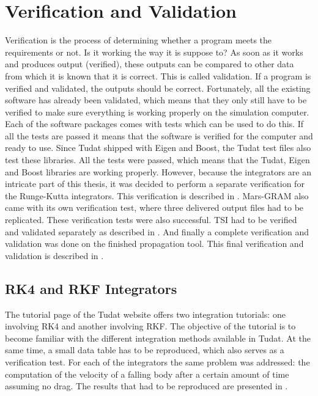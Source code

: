 \chapter{Verification and Validation} 
\label{ch:verificationandvalidation}
Verification is the process of determining whether a program meets the requirements or not. Is it working the way it is suppose to? As soon as it works and produces output (verified), these outputs can be compared to other data from which it is known that it is correct. This is called validation. If a program is verified and validated, the outputs should be correct. Fortunately, all the existing software has already been validated, which means that they only still have to be verified to make sure everything is working properly on the simulation computer. Each of the software packages comes with tests which can be used to do this. If all the tests are passed it means that the software is verified for the computer and ready to use. Since \ac{Tudat} shipped with Eigen and Boost, the \ac{Tudat} test files also test these libraries. All the tests were passed, which means that the \ac{Tudat}, Eigen and Boost libraries are working properly. However, because the integrators are an intricate part of this thesis, it was decided to perform a separate verification for the Runge-Kutta integrators. This verification is described in . Mars-\ac{GRAM} also came with its own verification test, where three delivered output files had to be replicated. These verification tests were also successful. \ac{TSI} had to be verified and validated separately as described in . And finally a complete verification and validation was done on the finished propagation tool. This final verification and validation is described in .


\section{\acs{RK4} and \acs{RKF} Integrators}
\label{sec:rkandrkfver}
The tutorial page of the \ac{Tudat} website \citep{dirkx2016tudat} offers two integration tutorials: one involving \ac{RK4} and another involving \ac{RKF}. The objective of the tutorial is to become familiar with the different integration methods available in \ac{Tudat}. At the same time, a small data table has to be reproduced, which also serves as a verification test. For each of the integrators the same problem was addressed: the computation of the velocity of a falling body after a certain amount of time assuming no drag. The results that had to be reproduced are presented in .


